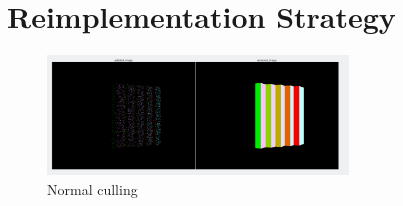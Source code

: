 \section{Reimplementation Strategy}
\label{sec:remplementation}
\begin{figure}[H]
    \centering
    \includegraphics[width=8cm]{figures/normal_culling.png}
    \caption{Normal culling}
    \label{fig:normal_culling}
\end{figure}